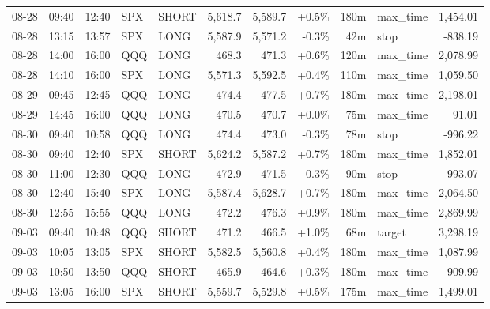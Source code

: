 \documentclass[11pt,a4paper,twoside]{article}
\begin{document}
\begin{center}
\begin{longtable}{>{\color{txtmain}}l l l l l r r r r >{\color{txtmain}}l r}
08-28 & 09:40 & 12:40 & SPX & SHORT & 5,618.7 & 5,589.7 & \textcolor{wingreen}{+0.5\%} & 180m & max\_time & \textcolor{wingreen}{1,454.01} \\
08-28 & 13:15 & 13:57 & SPX & LONG & 5,587.9 & 5,571.2 & \textcolor{lossred}{-0.3\%} & 42m & stop & \textcolor{lossred}{-838.19} \\
08-28 & 14:00 & 16:00 & QQQ & LONG & 468.3 & 471.3 & \textcolor{wingreen}{+0.6\%} & 120m & max\_time & \textcolor{wingreen}{2,078.99} \\
08-28 & 14:10 & 16:00 & SPX & LONG & 5,571.3 & 5,592.5 & \textcolor{wingreen}{+0.4\%} & 110m & max\_time & \textcolor{wingreen}{1,059.50} \\
08-29 & 09:45 & 12:45 & QQQ & LONG & 474.4 & 477.5 & \textcolor{wingreen}{+0.7\%} & 180m & max\_time & \textcolor{wingreen}{2,198.01} \\
08-29 & 14:45 & 16:00 & QQQ & LONG & 470.5 & 470.7 & \textcolor{wingreen}{+0.0\%} & 75m & max\_time & \textcolor{wingreen}{91.01} \\
08-30 & 09:40 & 10:58 & QQQ & LONG & 474.4 & 473.0 & \textcolor{lossred}{-0.3\%} & 78m & stop & \textcolor{lossred}{-996.22} \\
08-30 & 09:40 & 12:40 & SPX & SHORT & 5,624.2 & 5,587.2 & \textcolor{wingreen}{+0.7\%} & 180m & max\_time & \textcolor{wingreen}{1,852.01} \\
08-30 & 11:00 & 12:30 & QQQ & LONG & 472.9 & 471.5 & \textcolor{lossred}{-0.3\%} & 90m & stop & \textcolor{lossred}{-993.07} \\
08-30 & 12:40 & 15:40 & SPX & LONG & 5,587.4 & 5,628.7 & \textcolor{wingreen}{+0.7\%} & 180m & max\_time & \textcolor{wingreen}{2,064.50} \\
08-30 & 12:55 & 15:55 & QQQ & LONG & 472.2 & 476.3 & \textcolor{wingreen}{+0.9\%} & 180m & max\_time & \textcolor{wingreen}{2,869.99} \\
09-03 & 09:40 & 10:48 & QQQ & SHORT & 471.2 & 466.5 & \textcolor{wingreen}{+1.0\%} & 68m & target & \textcolor{wingreen}{3,298.19} \\
09-03 & 10:05 & 13:05 & SPX & SHORT & 5,582.5 & 5,560.8 & \textcolor{wingreen}{+0.4\%} & 180m & max\_time & \textcolor{wingreen}{1,087.99} \\
09-03 & 10:50 & 13:50 & QQQ & SHORT & 465.9 & 464.6 & \textcolor{wingreen}{+0.3\%} & 180m & max\_time & \textcolor{wingreen}{909.99} \\
09-03 & 13:05 & 16:00 & SPX & SHORT & 5,559.7 & 5,529.8 & \textcolor{wingreen}{+0.5\%} & 175m & max\_time & \textcolor{wingreen}{1,499.01} \\

\end{longtable}
\end{center}
\end{document}
